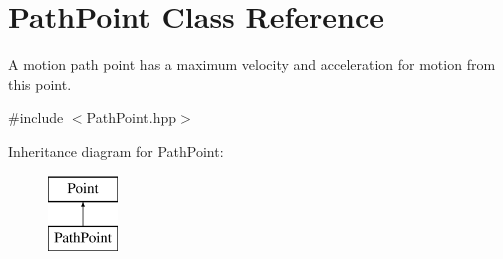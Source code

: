 \hypertarget{classPathPoint}{\section{Path\-Point Class Reference}
\label{classPathPoint}
}


A motion path point has a maximum velocity and acceleration for motion from this point.  




{\ttfamily \#include $<$Path\-Point.\-hpp$>$}

Inheritance diagram for Path\-Point\-:\begin{figure}[H]
\begin{center}
\leavevmode
\includegraphics[height=2.000000cm]{classPathPoint}
\end{center}
\end{figure}
